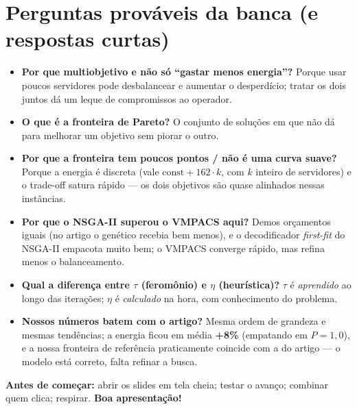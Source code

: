 \documentclass[11pt]{article}
\begin{document}
\section{Perguntas prováveis da banca (e respostas curtas)}
\begin{itemize}[leftmargin=1.4em,itemsep=4pt]
  \item \textbf{Por que multiobjetivo e não só ``gastar menos energia''?}
  Porque usar poucos servidores pode desbalancear e aumentar o desperdício;
  tratar os dois juntos dá um leque de compromissos ao operador.
  \item \textbf{O que é a fronteira de Pareto?} O conjunto de soluções em que não
  dá para melhorar um objetivo sem piorar o outro.
  \item \textbf{Por que a fronteira tem poucos pontos / não é uma curva suave?}
  Porque a energia é discreta (vale $\text{const}+162\cdot k$, com $k$ inteiro de
  servidores) e o trade-off satura rápido --- os dois objetivos são quase
  alinhados nessas instâncias.
  \item \textbf{Por que o NSGA-II superou o VMPACS aqui?} Demos orçamentos iguais
  (no artigo o genético recebia bem menos), e o decodificador \emph{first-fit} do
  NSGA-II empacota muito bem; o VMPACS converge rápido, mas refina menos o
  balanceamento.
  \item \textbf{Qual a diferença entre $\tau$ (feromônio) e $\eta$ (heurística)?}
  $\tau$ é \emph{aprendido} ao longo das iterações; $\eta$ é \emph{calculado} na
  hora, com conhecimento do problema.
  \item \textbf{Nossos números batem com o artigo?} Mesma ordem de grandeza e
  mesmas tendências; a energia ficou em média \textbf{+8\%} (empatando em
  $P=1{,}0$), e a nossa fronteira de referência praticamente coincide com a do
  artigo --- o modelo está correto, falta refinar a busca.
\end{itemize}

\begin{ideia}
\textbf{Antes de começar:} abrir os slides em tela cheia; testar o avanço;
combinar quem clica; respirar. \textbf{Boa apresentação!}
\end{ideia}
\end{document}

